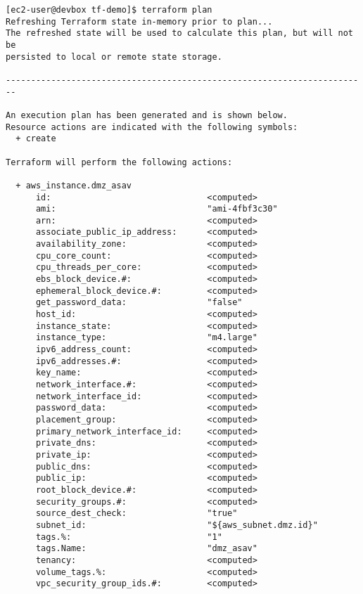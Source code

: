 \begin{verbatim}
[ec2-user@devbox tf-demo]$ terraform plan
Refreshing Terraform state in-memory prior to plan...
The refreshed state will be used to calculate this plan, but will not be
persisted to local or remote state storage.

------------------------------------------------------------------------

An execution plan has been generated and is shown below.
Resource actions are indicated with the following symbols:
  + create

Terraform will perform the following actions:

  + aws_instance.dmz_asav
      id:                               <computed>
      ami:                              "ami-4fbf3c30"
      arn:                              <computed>
      associate_public_ip_address:      <computed>
      availability_zone:                <computed>
      cpu_core_count:                   <computed>
      cpu_threads_per_core:             <computed>
      ebs_block_device.#:               <computed>
      ephemeral_block_device.#:         <computed>
      get_password_data:                "false"
      host_id:                          <computed>
      instance_state:                   <computed>
      instance_type:                    "m4.large"
      ipv6_address_count:               <computed>
      ipv6_addresses.#:                 <computed>
      key_name:                         <computed>
      network_interface.#:              <computed>
      network_interface_id:             <computed>
      password_data:                    <computed>
      placement_group:                  <computed>
      primary_network_interface_id:     <computed>
      private_dns:                      <computed>
      private_ip:                       <computed>
      public_dns:                       <computed>
      public_ip:                        <computed>
      root_block_device.#:              <computed>
      security_groups.#:                <computed>
      source_dest_check:                "true"
      subnet_id:                        "${aws_subnet.dmz.id}"
      tags.%:                           "1"
      tags.Name:                        "dmz_asav"
      tenancy:                          <computed>
      volume_tags.%:                    <computed>
      vpc_security_group_ids.#:         <computed>


\end{verbatim}
